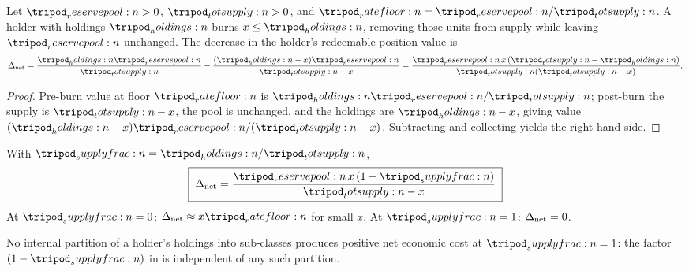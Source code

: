 \documentclass[../main.tex]{subfiles}
\begin{document}
\begin{theorem}
    \label{thm:costliness:conservation-identity}
    Let $\reservepool{} > 0$, $\totsupply{} > 0$, and
    $\ratefloor{} = \reservepool{}/\totsupply{}$. A holder with holdings $\holdings{}$ burns
    $x \leq \holdings{}$, removing those units from supply while leaving $\reservepool{}$
    unchanged. The decrease in the holder's redeemable position value is
    \begin{equation}
        \netcost
        = \frac{\holdings{}\reservepool{}}{\totsupply{}}
        - \frac{(\holdings{} - x)\reservepool{}}{\totsupply{} - x}
        = \frac{\reservepool{}\,x\,(\totsupply{} - \holdings{})}
               {\totsupply{}(\totsupply{} - x)}.
        \label{eq:costliness:conservation-identity}
    \end{equation}
\end{theorem}
\begin{proof}
    Pre-burn value at floor $\ratefloor{}$ is $\holdings{}\reservepool{}/\totsupply{}$;
    post-burn the supply is $\totsupply{} - x$, the pool is unchanged, and the holdings are
    $\holdings{} - x$, giving value $(\holdings{}-x)\reservepool{}/(\totsupply{}-x)$.
    Subtracting and collecting yields the right-hand side.
\end{proof}

\begin{corollary}
    \label{cor:costliness:supply-fraction-form}
    With $\supplyfrac{} = \holdings{}/\totsupply{}$,
    \begin{equation}
        \KEY{\;
        \netcost
        = \frac{\reservepool{}\,x\,(1 - \supplyfrac{})}{\totsupply{} - x}
        \;}
        \label{eq:costliness:supply-fraction-form}
    \end{equation}
    At $\supplyfrac{} = 0$: $\netcost \approx x\ratefloor{}$ for small $x$. At
    $\supplyfrac{} = 1$: $\Delta\sb{\mathrm{net}} = 0$.
\end{corollary}

\begin{theorem}
    \label{thm:costliness:structural-impossibility}
    No internal partition of a holder's holdings into sub-classes produces positive net
    economic cost at $\supplyfrac{} = 1$: the factor $(1 - \supplyfrac{})$ in
     is independent of any such partition.
\end{theorem}
\end{document}
